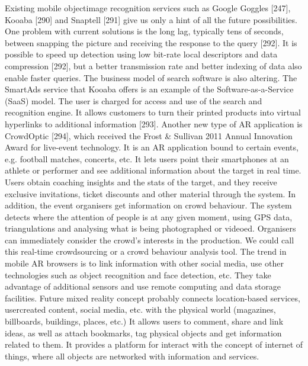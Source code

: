 Existing mobile object\/image recognition services such as Google Goggles [247], Kooaba [290] and Snaptell [291] give us only a hint of all the future possibilities. One problem with current solutions is the long lag, typically tens of seconds, between snapping the picture and receiving the response to the query [292]. It is possible to speed up detection using low bit-rate local descriptors and data compression [292], but a better transmission rate and better indexing of data also enable faster queries. The business model of search software is also altering. The SmartAds service that Kooaba offers is an example of the Software-as-a-Service (SaaS) model. The user is charged for access and use of the search and recognition engine. It allows customers to turn their printed products into virtual hyperlinks to additional information [293]. Another new type of AR application is CrowdOptic [294], which received the Frost \& Sullivan 2011 Annual Innovation Award for live-event technology. It is an AR application bound to certain events, e.g. football matches, concerts, etc. It lets users point their smartphones at an athlete or performer and see additional information about the target in real time. Users obtain coaching insights and the stats of the target, and they receive exclusive invitations, ticket discounts and other material through the system. In addition, the event organisers get information on crowd behaviour. The system detects where the attention of people is at any given moment, using GPS data, triangulations and analysing what is being photographed or videoed. Organisers can immediately consider the crowd’s interests in the production. We could call this real-time crowdsourcing or a crowd behaviour analysis tool. The trend in mobile AR browsers is to link information with other social media, use other technologies such as object recognition and face detection, etc. They take advantage of additional sensors and use remote computing and data storage facilities. Future mixed reality concept probably connects location-based services, usercreated content, social media, etc. with the physical world (magazines, billboards, buildings, places, etc.) It allows users to comment, share and link ideas, as well as attach bookmarks, tag physical objects and get information related to them. It provides a platform for interact with the concept of internet of things, where all objects are networked with information and services.

